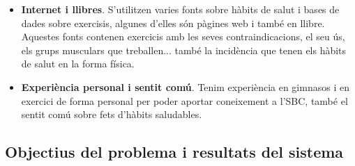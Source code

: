 \begin{itemize}
    \item \textbf{Internet i llibres}. S'utilitzen varies fonts sobre hàbits de salut\cite{health}\cite{fitnesspal} i bases de dades sobre exercisis, algunes d'elles són pàgines web\cite{bodybuild}\cite{fitnesspal} i també en llibre\cite{strech}.
    Aquestes fonts contenen exercicis amb les seves contraindicacions, el seu ús, els grups musculars que treballen... també la incidència que tenen els hàbits de salut en la forma física.
    
    \item \textbf{Experiència personal i sentit comú}. Tenim experiència en gimnasos i en exercici de forma personal per poder aportar coneixement a l'SBC, també el sentit comú sobre fets d'hàbits saludables.
    
\end{itemize}

\subsection{Objectius del problema i resultats del sistema}